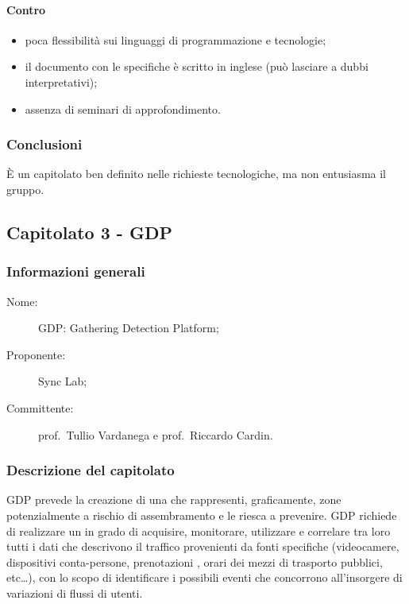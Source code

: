 \paragraph*{Contro}
\begin{itemize}
	\item poca flessibilità sui linguaggi di programmazione e tecnologie;
	\item il documento con le specifiche è scritto in inglese (può lasciare a dubbi interpretativi);
	\item assenza di seminari di approfondimento.
\end{itemize}
\subsubsection{Conclusioni}
È un capitolato ben definito nelle richieste tecnologiche, ma non entusiasma il gruppo.

\subsection{Capitolato 3 - GDP}
\subsubsection{Informazioni generali}
\begin{description}
	\item[Nome:] GDP: Gathering Detection Platform;
	\item[Proponente:] Sync Lab;
	\item[Committente:] prof.~Tullio Vardanega e prof.~Riccardo Cardin.
\end{description}
\subsubsection{Descrizione del capitolato}
GDP prevede la creazione di una  che rappresenti, graficamente, zone potenzialmente a rischio di assembramento e le riesca a prevenire. GDP richiede di realizzare un  in grado di acquisire, monitorare, utilizzare e correlare tra loro tutti i dati che descrivono il traffico provenienti da fonti specifiche (videocamere, dispositivi conta-persone, prenotazioni , orari dei mezzi di trasporto pubblici, etc\dots), con lo scopo di identificare i possibili eventi che concorrono all'insorgere di variazioni di flussi di utenti.
